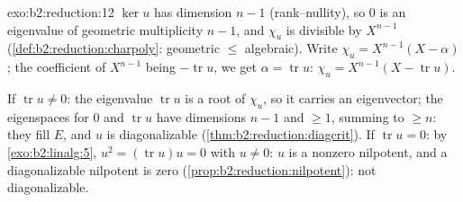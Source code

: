 \begin{solution}{exo:b2:reduction:12}
$\ker u$ has dimension $n - 1$ (rank--nullity), so $0$ is an
eigenvalue of geometric multiplicity $n - 1$, and $\chi_u$ is
divisible by $X^{n-1}$
(\cref{def:b2:reduction:charpoly}: geometric $\leq$ algebraic).
Write $\chi_u = X^{n-1}(X - \alpha)$; the coefficient of
$X^{n-1}$ being $-\operatorname{tr} u$, we get $\alpha =
\operatorname{tr} u$: $\chi_u = X^{n-1}(X - \operatorname{tr}
u)$.

If $\operatorname{tr} u \neq 0$: the eigenvalue
$\operatorname{tr} u$ is a root of $\chi_u$, so it carries an
eigenvector; the eigenspaces for $0$ and $\operatorname{tr} u$
have dimensions $n - 1$ and $\geq 1$, summing to $\geq n$: they
fill $E$, and $u$ is diagonalizable
(\cref{thm:b2:reduction:diagcrit}). If $\operatorname{tr} u = 0$:
by \cref{exo:b2:linalg:5}, $u^2 = (\operatorname{tr} u)u = 0$
with $u \neq 0$: $u$ is a nonzero nilpotent, and a diagonalizable
nilpotent is zero (\cref{prop:b2:reduction:nilpotent}): not
diagonalizable.
\end{solution}

